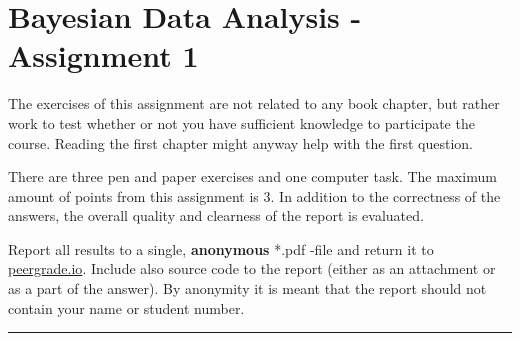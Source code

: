 \documentclass[11pt,a4paper,english]{article}
\newcommand{\HRule}{\rule{\linewidth}{0.5mm}}
\begin{document}
\section*{Bayesian Data Analysis - Assignment 1}


The exercises of this assignment are not related to any book chapter, but rather work to test whether or not you have sufficient knowledge to participate the course. Reading the first chapter might anyway help with the first question.

There are three pen and paper exercises and one computer task. The maximum amount of points from this assignment is 3. In addition to the correctness of the answers, the overall quality and clearness of the report is evaluated.

Report all results to a single, {\bf anonymous} *.pdf -file and return it to \href{peergrade.io}{peergrade.io}. Include also source code to the report (either as an attachment or as a part of the answer). By anonymity it is meant that the report should not contain your name or student number.



\HRule
\end{document}
